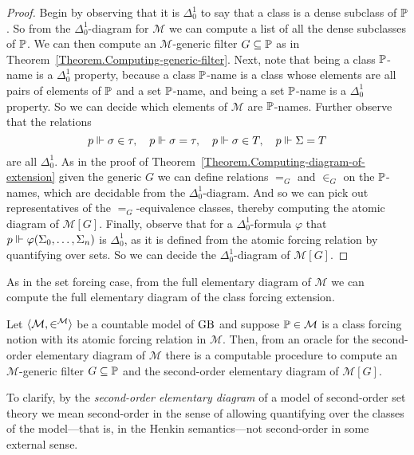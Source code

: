 \documentclass{amsart}
\begin{document}
\begin{proof}
  Begin by observing that it is $\Delta^1_0$ to say that a class is a dense subclass of $\P$. So from the $\Delta^1_0$-diagram for $\mathcal M$ we can compute a list of all the dense subclasses of $\P$. We can then compute an $\mathcal M$-generic filter $G \subseteq \P$ as in Theorem~\ref{Theorem.Computing-generic-filter}. Next, note that being a class $\P$-name is a $\Delta^1_0$ property, because a class $\P$-name is a class whose elements are all pairs of elements of $\P$ and a set $\P$-name, and being a set $\P$-name is a $\Delta^1_0$ property. So we can decide which elements of $\mathcal M$ are $\P$-names. Further observe that the relations
$$
p \forces  \sigma \in \tau, \quad p \forces \sigma = \tau, \quad p \forces \sigma \in T, \quad p \forces \Sigma = T
$$
are all $\Delta^1_0$. As in the proof of Theorem~\ref{Theorem.Computing-diagram-of-extension} given the generic $G$ we can define relations $=_G$ and $\in_G$ on the $\P$-names, which are decidable from the $\Delta^1_0$-diagram. And so we can pick out representatives of the $=_G$-equivalence classes, thereby computing the atomic diagram of $\mathcal M[G]$. Finally, observe that for a $\Delta^1_0$-formula $\varphi$ that $p \forces \varphi(\Sigma_0, \ldots, \Sigma_n)$ is $\Delta^1_0$, as it is defined from the atomic forcing relation by quantifying over sets. So we can decide the $\Delta^1_0$-diagram of $\mathcal M[G]$.
\end{proof}

As in the set forcing case, from the full elementary diagram of $\mathcal M$ we can compute the full elementary diagram of the class forcing extension.

\begin{theorem}
Let $\<\mathcal{M},\in^{\mathcal{M}}>$ be a countable model of $\GB{}$ and suppose $\P \in \mathcal M$ is a class forcing notion with its atomic forcing relation in $\mathcal M$. Then, from an oracle for the second-order elementary diagram of $\mathcal M$ there is a computable procedure to compute an $\mathcal M$-generic filter $G \subseteq \P$ and the second-order elementary diagram of $\mathcal{M}[G]$. \end{theorem}

To clarify, by the \emph{second-order elementary diagram} of a model of second-order set theory we mean second-order in the sense of allowing quantifying over the classes of the model---that is, in the Henkin semantics---not second-order in some external sense.
\end{document}
